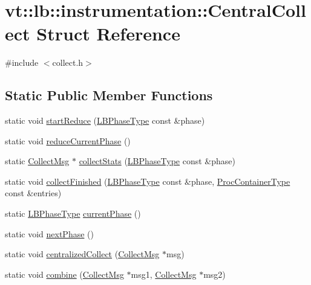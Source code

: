 \hypertarget{structvt_1_1lb_1_1instrumentation_1_1_central_collect}{}\section{vt\+:\+:lb\+:\+:instrumentation\+:\+:Central\+Collect Struct Reference}
\label{structvt_1_1lb_1_1instrumentation_1_1_central_collect}


{\ttfamily \#include $<$collect.\+h$>$}

\subsection*{Static Public Member Functions}
\begin{DoxyCompactItemize}
\item 
static void \hyperlink{structvt_1_1lb_1_1instrumentation_1_1_central_collect_a1b5d16c13976ea4c6db0275ef3ff35d8}{start\+Reduce} (\hyperlink{namespacevt_a5505d0bab25ce2ff566a8e015871b379}{L\+B\+Phase\+Type} const \&phase)
\item 
static void \hyperlink{structvt_1_1lb_1_1instrumentation_1_1_central_collect_adc3e069b48fdd2031d23cbfa66885537}{reduce\+Current\+Phase} ()
\item 
static \hyperlink{structvt_1_1lb_1_1instrumentation_1_1_collect_msg}{Collect\+Msg} $\ast$ \hyperlink{structvt_1_1lb_1_1instrumentation_1_1_central_collect_a32fc6e709d1a02d68e8bf2d4b142a67b}{collect\+Stats} (\hyperlink{namespacevt_a5505d0bab25ce2ff566a8e015871b379}{L\+B\+Phase\+Type} const \&phase)
\item 
static void \hyperlink{structvt_1_1lb_1_1instrumentation_1_1_central_collect_a3b41c4af5113e069d87d5d10e3c7ae59}{collect\+Finished} (\hyperlink{namespacevt_a5505d0bab25ce2ff566a8e015871b379}{L\+B\+Phase\+Type} const \&phase, \hyperlink{namespacevt_1_1lb_af7c6ee21a7b3966b7ab64c5b626d30f8}{Proc\+Container\+Type} const \&entries)
\item 
static \hyperlink{namespacevt_a5505d0bab25ce2ff566a8e015871b379}{L\+B\+Phase\+Type} \hyperlink{structvt_1_1lb_1_1instrumentation_1_1_central_collect_ae9561fb73a1aa198c1b69941870b8a6a}{current\+Phase} ()
\item 
static void \hyperlink{structvt_1_1lb_1_1instrumentation_1_1_central_collect_aa0cc1c988760bbb5d6f1fd008e827777}{next\+Phase} ()
\item 
static void \hyperlink{structvt_1_1lb_1_1instrumentation_1_1_central_collect_a08855053af75446a7bc080592126bb1a}{centralized\+Collect} (\hyperlink{structvt_1_1lb_1_1instrumentation_1_1_collect_msg}{Collect\+Msg} $\ast$msg)
\item 
static void \hyperlink{structvt_1_1lb_1_1instrumentation_1_1_central_collect_a38b6e55982754362cbea1921e044038c}{combine} (\hyperlink{structvt_1_1lb_1_1instrumentation_1_1_collect_msg}{Collect\+Msg} $\ast$msg1, \hyperlink{structvt_1_1lb_1_1instrumentation_1_1_collect_msg}{Collect\+Msg} $\ast$msg2)
\end{DoxyCompactItemize}


